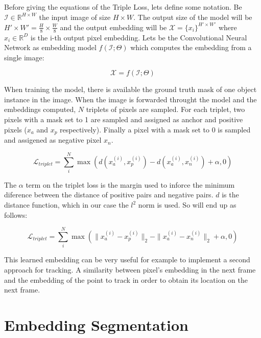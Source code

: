 Before giving the equations of the Triple Loss, lets define some notation.
Be $\mathcal{I} \in \mathbb{R}^{H \times W}$ the input image of size $H \times W$.
The output size of the model will be $H' \times W' = \frac{H}{8} \times \frac{W}{8}$ and the output embedding will be $\mathcal{X} = \{x_i\}^{H' \times W'}$ where $x_i \in \mathbb{R}^D$ is the i-th output pixel embedding.
Lets be the Convolutional Neural Network as embedding model $f(\mathcal{I}; \Theta)$ which computes the embedding from a single image:

\begin{equation}
  \mathcal{X} = f(\mathcal{I}; \Theta)
\end{equation}

When training the model, there is available the ground truth mask of one object instance in the image. When the image is forwarded throught the model and the embeddings computed, $N$ triplets of pixels are sampled. For each triplet, two pixels with a mask set to 1 are sampled and assigned as anchor and positive pixels ($x_a$ and $x_p$ respectively). Finally a pixel with a mask set to 0 is sampled and assigened as negative pixel $x_n$.

\begin{equation}
  \label{eq:triplet_loss_1}
  \mathcal{L}_{triplet} = \sum_i^N \max \left( d(x_a^{(i)}, x_p^{(i)}) - d(x_a^{(i)}, x_n^{(i)})  + \alpha, 0 \right)
\end{equation}

The $\alpha$ term on the triplet loss is the margin used to inforce the minimum diference between the distance of positive pairs and negative pairs. $d$ is the distance function, which in our case the $l^2$ norm is used. So  will end up as follows:

\begin{equation}
  \label{eq:triplet_loss_2}
  \mathcal{L}_{triplet} =
	\sum_i^N \max \left(
		\|x_a^{(i)} - x_p^{(i)}\|_2 - \|x_a^{(i)} - x_n^{(i)}\|_2  + \alpha,
		0 \right)
\end{equation}

This learned embedding can be very useful for example to implement a second approach for tracking.
A similarity between pixel's embedding in the next frame and the embedding of the point to track in order to obtain its location on the next frame.



\section{Embedding Segmentation}

